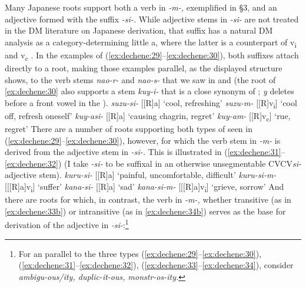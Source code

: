 \documentclass[output=paper,
modfonts
]{LSP/langsci}
\begin{document}
Many Japanese roots support both a verb  in \textit{-m-,} exemplified
in \S3, and an adjective  formed with the suffix \textit{-si-.}
While adjective stems in \textit{-si-} are not treated in the DM
literature on Japanese derivation, that suffix has a natural DM analysis
as a category-determining little a, where the latter is a 
counterpart of  v\textsubscript{i} and 
v\textsubscript{c} \citep[103]{marantz2013a}. In the examples of (\ref{ex:dechene:29}--\ref{ex:dechene:30}),
both suffixes attach directly to a root, making those examples parallel,
as the displayed structure shows, to the verb stems \textit{nao-r-} and
\textit{nao-s-} that we saw in  and  (the root of \ref{ex:dechene:30} also
supports a stem \textit{kuy-i-} that is a close synonym of ; \textit{y}
deletes before a front vowel in the ).
\ea \label{ex:dechene:29}
	\ea \label{ex:dechene:29a} \textit{suzu-si-} {[}{[}R{]}a{]} `cool, refreshing'
	\ex \label{ex:dechene:29b} \textit{suzu-m-} {[}{[}R{]}v\textsubscript{i}{]} `cool off, refresh oneself'
	\z
\ex \label{ex:dechene:30} 
	\ea \label{ex:dechene:30a} \textit{kuy-asi-} {[}{[}R{]}a{]} `causing chagrin, regret'
	\ex \label{ex:dechene:30b} \textit{kuy-am-} {[}{[}R{]}v\textsubscript{c}{]} `rue, regret'
	\z
\z
There are a number of roots supporting both types of  seen in
(\ref{ex:dechene:29}--\ref{ex:dechene:30}), however, for which the verb stem in \textit{-m-} is derived
from the adjective stem in \textit{-si-.} This is illustrated in (\ref{ex:dechene:31}--\ref{ex:dechene:32})
(I take \textit{-si-} to be suffixal in an otherwise unsegmentable
CVCV\textit{si-} adjective stem).
\ea \label{ex:dechene:31}
	\ea \label{ex:dechene:31a} \textit{kuru-si-} {[}{[}R{]}a{]} `painful, uncomfortable, difficult'
	\ex \label{ex:dechene:31b} \textit{kuru-si-m-} {[}{[}{[}R{]}a{]}v\textsubscript{i}{]} `suffer'
	\z
\ex \label{ex:dechene:32} 
	\ea \label{ex:dechene:32a} \textit{kana-si-} {[}{[}R{]}a{]} `sad'
	\ex \label{ex:dechene:32b} \textit{kana-si-m-} {[}{[}{[}R{]}a{]}v\textsubscript{i}{]} `grieve, sorrow'
	\z
\z
And there are roots for which, in contrast, the verb  in \textit{-m-,}
whether transitive (as in \ref{ex:dechene:33b}) or intransitive (as in \ref{ex:dechene:34b}) serves as
the base for derivation of the adjective  in \textit{-si-}:\footnote{For
  an  parallel to the three types (\ref{ex:dechene:29}--\ref{ex:dechene:30}), (\ref{ex:dechene:31}--\ref{ex:dechene:32}), (\ref{ex:dechene:33}--\ref{ex:dechene:34}),
  consider \textit{ambigu-ous/ity, duplic-it-ous, monstr-os-ity.}}
\end{document}
